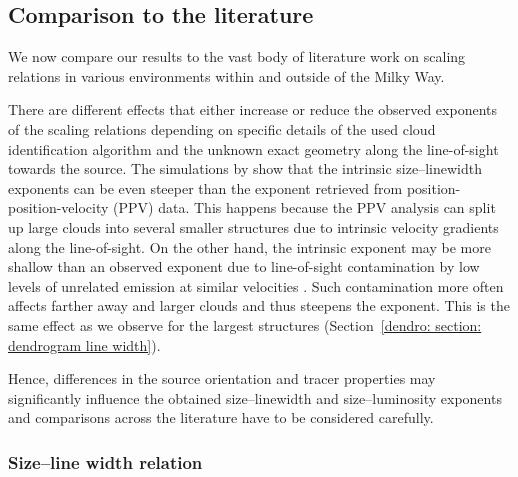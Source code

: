 
\subsection{Comparison to the literature}
\label{dendro: section: literature}

We now compare our results to the vast body of literature work on scaling relations in various environments within and outside of the Milky Way.

There are different effects that either increase or reduce the observed exponents of the scaling relations depending on specific details of the used cloud identification algorithm and the unknown exact geometry along the line-of-sight towards the source.
The simulations by \citet{2010ApJ...712.1049S} show that the intrinsic size--linewidth exponents can be even steeper than the exponent retrieved from position-position-velocity (PPV) data. This happens because the PPV analysis can split up large clouds into several smaller structures due to intrinsic velocity gradients along the line-of-sight.
On the other hand, the intrinsic exponent may be more shallow than an observed exponent due to line-of-sight contamination by low levels of unrelated emission at similar velocities \citep{2019MNRAS.490.2648B}. Such contamination more often affects farther away and larger clouds and thus steepens the exponent.
This is the same effect as we observe for the largest structures (Section~\ref{dendro: section: dendrogram line width}).

Hence, differences in the source orientation and tracer properties may significantly influence the obtained size--linewidth and size--luminosity exponents and comparisons across the literature have to be considered carefully.



\subsubsection{Size--line width relation}
\label{dendro: section: literature: size line width}

